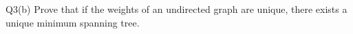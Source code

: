 \begin{problem}
  {Q3(b)}
  Prove that if the weights of an undirected graph are unique, there exists a unique minimum spanning tree.
\end{problem}
